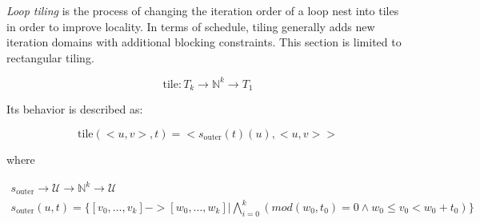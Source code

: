 \documentclass{article}
\begin{document}
\emph{Loop tiling} is the process of changing the iteration order of a loop
nest into tiles in order to improve locality. In terms of schedule, tiling
generally adds new iteration domains with additional blocking constraints. This
section is limited to rectangular tiling.

\[
    \text{tile}: T_k \rightarrow \mathbb{N}^k \rightarrow T_1
\]

Its behavior is described as:

\[
    \text{tile}(<u, v>, t) = < s_\text{outer}(t)(u), < u, v > >
\]

\noindent where

\[
    \begin{array}{l}
        s_\text{outer} \rightarrow \mathcal{U} \rightarrow \mathbb{N}^k \rightarrow \mathcal{U} \\
    s_\text{outer}(u, t) = \{ [v_0, \ldots, v_k] -> [w_0, \ldots, w_k] | \bigwedge_{i=0}^k(mod(w_0, t_0) = 0 \wedge w_0 \le v_0 < w_0 + t_0) \}
    \end{array}
\]
\end{document}
